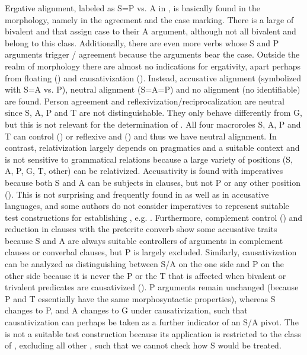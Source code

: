 Ergative alignment, labeled as S=P vs. A in , is basically found in the morphology, namely in the  agreement and the case marking. There is a large  of bivalent and  that assign  case to their A argument, although not all bivalent and  belong to this class. Additionally, there are even more verbs whose S and P arguments trigger / agreement because the arguments bear the  case. Outside the realm of morphology there are almost no indications for ergativity, apart perhaps from  floating () and causativization (). Instead, accusative alignment (symbolized with S=A vs. P), neutral alignment (S=A=P) and no alignment (no  identifiable) are found. Person agreement and reflexivization\slash reciprocalization are neutral since S, A, P and T are not distinguishable. They only behave differently from G, but this is not relevant for the determination of . All four macroroles S, A, P and T can control  () or reflexive and  () and thus we have neutral alignment. In contrast, relativization largely depends on pragmatics and a suitable context and is not sensitive to grammatical relations because a large variety of positions (S, A, P, G, T, other) can be relativized. Accusativity is found with imperatives because both S and A can be subjects in  clauses, but not P or any other position (). This is not surprising and frequently found in  as well as in accusative languages, and some authors do not consider imperatives to represent suitable test constructions for establishing , e.g. \citet[131]{Dixon1994}. Furthermore, complement control () and  reduction in clauses with the preterite converb show some accusative traits because S and A are always suitable controllers of arguments in complement clauses or converbal clauses, but P is largely excluded. Similarly, causativization can be analyzed as distinguishing between S/A on the one side and P on the other side because it is never the P or the T that is affected when bivalent or trivalent predicates are causativized (). P arguments remain unchanged (because P and T essentially have the same morphosyntactic properties), whereas S changes to P, and A changes to G under causativization, such that causativization can perhaps be taken as a further indicator of an S/A pivot. The  is not a suitable test construction because its application is restricted to the class of , excluding all other , such that we cannot check how S would be treated.

